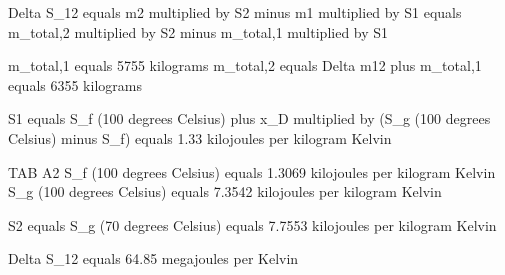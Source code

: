 Delta S_12 equals m2 multiplied by S2 minus m1 multiplied by S1 equals m_total,2 multiplied by S2 minus m_total,1 multiplied by S1  

m_total,1 equals 5755 kilograms  
m_total,2 equals Delta m12 plus m_total,1 equals 6355 kilograms  

S1 equals S_f (100 degrees Celsius) plus x_D multiplied by (S_g (100 degrees Celsius) minus S_f) equals 1.33 kilojoules per kilogram Kelvin  

TAB A2  
S_f (100 degrees Celsius) equals 1.3069 kilojoules per kilogram Kelvin  
S_g (100 degrees Celsius) equals 7.3542 kilojoules per kilogram Kelvin  

S2 equals S_g (70 degrees Celsius) equals 7.7553 kilojoules per kilogram Kelvin  

Delta S_12 equals 64.85 megajoules per Kelvin